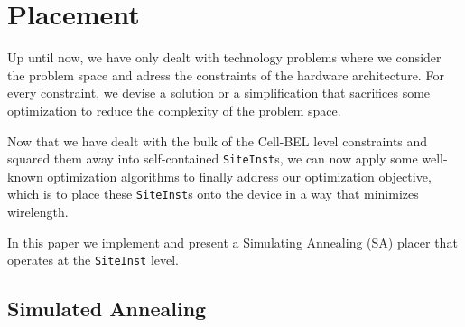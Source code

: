 
\section{Placement}
\label{sec:placement}
Up until now, we have only dealt with technology problems where we consider the problem space and adress the constraints of the hardware architecture. 
For every constraint, we devise a solution or a simplification that sacrifices some optimization to reduce the complexity of the problem space. 

Now that we have dealt with the bulk of the Cell-BEL level constraints and squared them away into self-contained \texttt{SiteInst}s, we can now apply some well-known optimization algorithms to finally address our optimization objective, which is to place these \texttt{SiteInst}s onto the device in a way that minimizes wirelength. 

In this paper we implement and present a Simulating Annealing (SA) placer that operates at the \texttt{SiteInst} level. 

\subsection{Simulated Annealing}
\label{subsec:simulated_annealing}

\begin{lstlisting}[language=java, caption={Simulated Annealing pseudocode}, label={lst:sa_pseudocode}]

\end{lstlisting}






